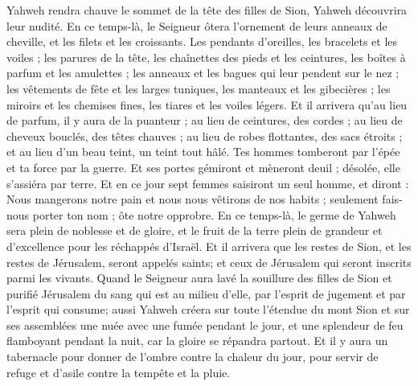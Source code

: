 \begin{multicols}{2}
Yahweh rendra chauve le sommet de la tête des filles de Sion, Yahweh découvrira leur nudité.
En ce temps-là, le Seigneur ôtera l'ornement de leurs anneaux de cheville, et les filets et les croissants.
Les pendants d'oreilles, les bracelets et les voiles ;
les parures de la tête, les chaînettes des pieds et les ceintures, les boîtes à parfum et les amulettes ;
les anneaux et les bagues qui leur pendent sur le nez ;
les vêtements de fête et les larges tuniques, les manteaux et les gibecières ;
les miroirs et les chemises fines, les tiares et les voiles légers.
Et il arrivera qu'au lieu de parfum, il y aura de la puanteur ; au lieu de ceintures, des cordes ; au lieu de cheveux bouclés, des têtes chauves ; au lieu de robes flottantes, des sacs étroits ; et au lieu d'un beau teint, un teint tout hâlé.
Tes hommes tomberont par l'épée et ta force par la guerre.
Et ses portes gémiront et mèneront deuil ; désolée, elle s'assiéra par terre.
\VerseOne{}Et en ce jour sept femmes saisiront un seul homme, et diront : Nous mangerons notre pain et nous nous vêtirons de nos habits ; seulement fais-nous porter ton nom ; ôte notre opprobre.
En ce temps-là, le germe de Yahweh sera plein de noblesse et de gloire, et le fruit de la terre plein de grandeur et d'excellence pour les réchappés d'Israël.
Et il arrivera que les restes de Sion, et les restes de Jérusalem, seront appelés saints; et ceux de Jérusalem qui seront inscrits parmi les vivants.
Quand le Seigneur aura lavé la souillure des filles de Sion et purifié Jérusalem du sang qui est au milieu d'elle, par l'esprit de jugement et par l'esprit qui consume;
aussi Yahweh créera sur toute l'étendue du mont Sion et sur ses assemblées une nuée avec une fumée pendant le jour, et une splendeur de feu flamboyant pendant la nuit, car la gloire se répandra partout.
Et il y aura un tabernacle pour donner de l'ombre contre la chaleur du jour, pour servir de refuge et d'asile contre la tempête et la pluie.

\end{multicols}
